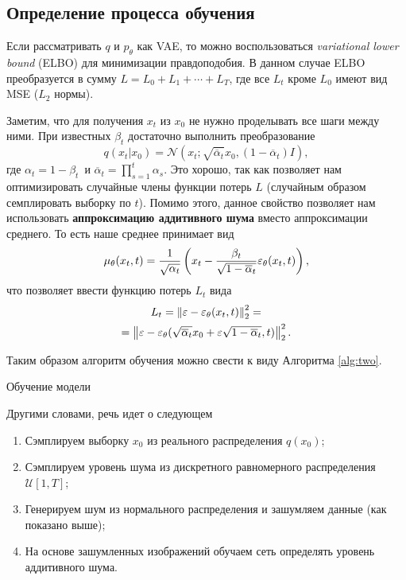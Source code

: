\documentclass[11pt, a4paper, twocolumn, twoside]{article} %
\begin{document}
\subsection{Определение процесса обучения}

Если рассматривать $q$ и $p_{\theta}$ как VAE, то можно воспользоваться \textit{variational lower bound} (ELBO) для минимизации правдоподобия. В данном случае ELBO преобразуется в сумму $L = L_0 + L_1 + \cdots + L_T$, где все $L_t$ кроме $L_0$ имеют вид MSE ($L_2$ нормы).

Заметим, что для получения $x_t$ из $x_0$ не нужно проделывать все шаги между ними. При известных $\beta_t$ достаточно выполнить преобразование 
\begin{equation}
	q(x_t | x_0) = \mathcal{N}(x_t; \sqrt{\overline\alpha_t}x_0, (1-\overline\alpha_t)I),
\end{equation}
где $\alpha_t = 1 - \beta_t$ и $\overline\alpha_t = \prod_{s=1}^t \alpha_s$. Это хорошо, так как позволяет нам оптимизировать случайные члены функции потерь $L$ (случайным образом семплировать выборку по $t$). Помимо этого, данное свойство позволяет нам использовать \textbf{аппроксимацию аддитивного шума} вместо аппроксимации среднего. То есть наше среднее принимает вид
\begin{equation}
	\mu_{\theta}(x_t, t) = \dfrac{1}{\sqrt{\alpha_t}}\left( x_t - \dfrac{\beta_t}{\sqrt{1 - \overline\alpha_t}}\varepsilon_\theta(x_t, t) \right),
\end{equation}
что позволяет ввести функцию потерь $L_t$ вида
\begin{multline}
	L_t = \left\Vert \varepsilon - \varepsilon_\theta(x_t, t) \right\Vert_2^2 = \\ = \left\Vert \varepsilon - \varepsilon_\theta(\sqrt{\overline\alpha_t}x_0 + \varepsilon\sqrt{1-\overline\alpha_t}, t) \right\Vert_2^2.
\end{multline}

Таким образом алгоритм обучения можно свести к виду Алгоритма \ref{alg:two}.
\begin{algorithm}
\caption{Обучение модели}\label{alg:two}
\end{algorithm}

Другими словами, речь идет о следующем
\begin{enumerate}
  \item Сэмплируем выборку $x_0$ из реального распределения $q(x_0)$;
  \item Сэмплируем уровень шума из дискретного равномерного распределения $\mathcal{U}[1, T]$;
  \item Генерируем шум из нормального распределения и зашумляем данные (как показано выше);
  \item На основе зашумленных изображений обучаем сеть определять уровень аддитивного шума.
\end{enumerate}
\end{document}
